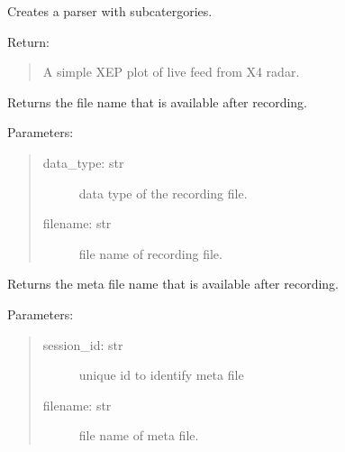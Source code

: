 \documentclass[letterpaper,10pt,english]{sphinxmanual}
\begin{document}
\begin{fulllineitems}
\label{\detokenize{X4 radar:X4_record_playback.main}}
Creates a parser with subcatergories.

Return:
\begin{quote}

A simple XEP plot of live feed from X4 radar.
\end{quote}

\end{fulllineitems}


\begin{fulllineitems}
\label{\detokenize{X4 radar:X4_record_playback.on_file_available}}
Returns the file name that is available after recording.

Parameters:
\begin{quote}
\begin{description}
\item[{data\_type: str}] \leavevmode
data type of the recording file.

\item[{filename: str}] \leavevmode
file name of recording file.

\end{description}
\end{quote}

\end{fulllineitems}


\begin{fulllineitems}
\label{\detokenize{X4 radar:X4_record_playback.on_meta_file_available}}
Returns the meta file name that is available after recording.

Parameters:
\begin{quote}
\begin{description}
\item[{session\_id: str}] \leavevmode
unique id to identify meta file

\item[{filename: str}] \leavevmode
file name of meta file.

\end{description}
\end{quote}

\end{fulllineitems}
\end{document}
